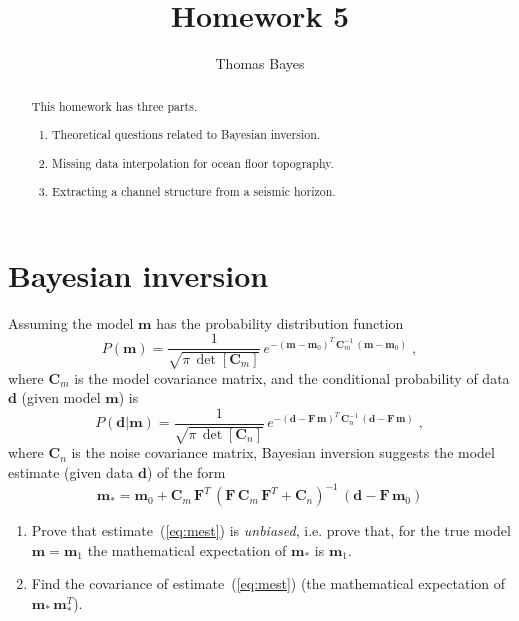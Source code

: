 \author{Thomas Bayes}
\title{Homework 5}

\begin{abstract}
  This homework has three parts. 
  \begin{enumerate}
  \item Theoretical questions related to Bayesian inversion.
  \item Missing data interpolation for ocean floor topography.
  \item Extracting a channel structure from a seismic horizon.
  \end{enumerate}
\end{abstract}

\section{Bayesian inversion}

Assuming the model $\mathbf{m}$ has the probability distribution function 
\begin{equation}
\label{eq:pm}
P(\mathbf{m}) = \frac{1}{\sqrt{\pi\,\det[\mathbf{C}_m]}}\,e^{-(\mathbf{m}-\mathbf{m}_0)^T\,\mathbf{C}_m^{-1}\,(\mathbf{m}-\mathbf{m}_0)}\;,
\end{equation}
where $\mathbf{C}_m$ is the model covariance matrix,
and the conditional probability of data $\mathbf{d}$ (given model $\mathbf{m}$) is
\begin{equation}
\label{eq:pdm}
P(\mathbf{d}|\mathbf{m}) = \frac{1}{\sqrt{\pi\,\det[\mathbf{C}_n]}}\,e^{-(\mathbf{d}-\mathbf{F}\,\mathbf{m})^T\,\mathbf{C}_n^{-1}\,(\mathbf{d}-\mathbf{F}\,\mathbf{m})}\;,
\end{equation}
where $\mathbf{C}_n$ is the noise covariance matrix, Bayesian inversion suggests the model estimate (given data $\mathbf{d}$) of the form
\begin{equation}
\label{eq:mest}
\mathbf{m}_{*} = \mathbf{m}_0 + 
\mathbf{C}_m\,\mathbf{F}^T\,\left(\mathbf{F}\,\mathbf{C}_m\,\mathbf{F}^T + \mathbf{C}_n\right)^{-1}\,\left(\mathbf{d} - \mathbf{F}\,\mathbf{m}_0\right)
\end{equation} 

\begin{enumerate}
\item Prove that estimate~(\ref{eq:mest}) is \emph{unbiased}, i.e. prove that, for the true model $\mathbf{m}=\mathbf{m}_1$ the mathematical expectation of $\mathbf{m}_{*}$ is $\mathbf{m}_1$.
\item Find the covariance of estimate~(\ref{eq:mest}) (the mathematical expectation of $\mathbf{m}_{*}\,\mathbf{m}_{*}^T$).
\end{enumerate}

